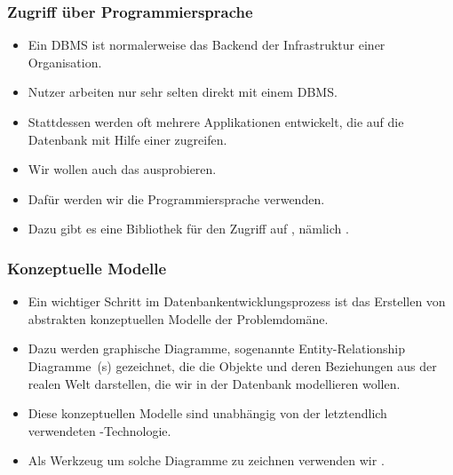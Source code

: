 \documentclass[aspectratio=169,mathserif,notheorems]{beamer}%
\begin{document}
%
\begin{frame}[b]%
\frametitle{Zugriff über Programmiersprache}%
\begin{itemize}%
\item Ein DBMS ist normalerweise das Backend der Infrastruktur einer Organisation.%
\item<2-> Nutzer arbeiten nur sehr selten direkt mit einem DBMS.%
\item<3-> Stattdessen werden oft mehrere Applikationen entwickelt, die auf die Datenbank mit Hilfe einer  zugreifen.%
\item<4-> Wir wollen auch das ausprobieren.%
\item<5-> Dafür werden wir die Programmiersprache \python\cite{K2018EIPFEUU,A2002PC,H2023ABGTP3P,LH2015DSAAWP,programmingWithPython} verwenden.%
\item<6-> Dazu gibt es eine Bibliothek für den Zugriff auf \postgresql, nämlich \psycopg\cite{VDGE2010P}.%
\end{itemize}%
%
%
\end{frame}%
%
\begin{frame}[b]%
\frametitle{Konzeptuelle Modelle}%
\begin{itemize}%
\item Ein wichtiger Schritt im Datenbankentwicklungsprozess ist das Erstellen von abstrakten konzeptuellen Modelle der Problemdomäne.%
\item<2-> Dazu werden graphische Diagramme, sogenannte Entity-Relationship Diagramme~(s) gezeichnet, die die Objekte und deren Beziehungen aus der realen Welt darstellen, die wir in der Datenbank modellieren wollen.%
\item<3-> Diese konzeptuellen Modelle sind unabhängig von der letztendlich verwendeten -Technologie.%
\item<4-> Als Werkzeug um solche Diagramme zu zeichnen verwenden wir \yEd\cite{SG2015MDAWY,Y2011YGEM}.%
\end{itemize}%
%
\end{frame}%
\end{document}
